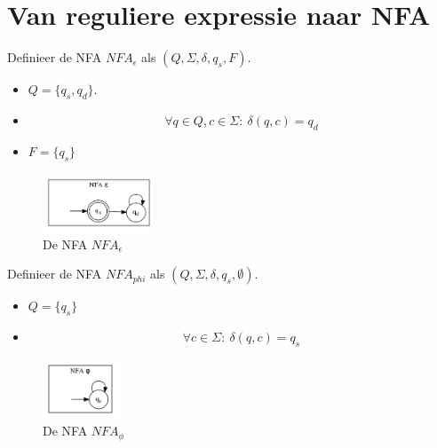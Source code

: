 \documentclass[main.tex]{subfiles}
\begin{document}
\section{Van reguliere expressie naar NFA}
\label{sec:van-reguliere-expressie-naar-nfa}

\begin{de}
  Definieer de NFA $NFA_{\epsilon}$ als $(Q, \Sigma, \delta, q_{s}, F)$.

  \begin{itemize}
  \item $Q = \{q_{s},q_{d}\}$.
  \item 
    \[ \forall q \in Q, c \in \Sigma:\ \delta(q,c) = q_{d} \]
  \item $F = \{q_{s}\}$
  \end{itemize}

  \begin{figure}[H]
    \centering
    \includegraphics[width=0.3\textwidth]{assets/nfa_epsilon.png}      
    \caption{De NFA $NFA_{\epsilon}$}
    \label{fig:nfa_epsilon}
  \end{figure}
\end{de}

\begin{de}
  Definieer de NFA $NFA_{phi}$ als $(Q, \Sigma, \delta, q_{s}, \emptyset)$.

  \begin{itemize}
  \item $Q = \{q_{s}\}$
  \item 
    \[ \forall c \in \Sigma:\ \delta(q,c) = q_{s} \]
  \end{itemize}

  \begin{figure}[H]
    \centering
    \includegraphics[width=0.2\textwidth]{assets/nfa_phi.png}      
    \caption{De NFA $NFA_{\phi}$}
    \label{fig:nfa_phi}
  \end{figure}
\end{de}
\end{document}
